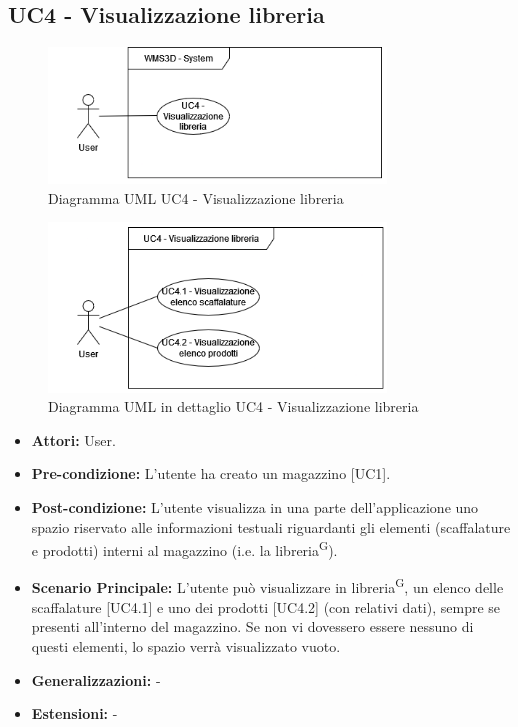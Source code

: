 \subsection{UC4 - Visualizzazione libreria}
\begin{figure}[H]
  \centering
  \includegraphics[width=0.8\textwidth]{UC_diagrams_1-10/UC4_sys.drawio.png}
   \caption{Diagramma UML UC4 - Visualizzazione libreria}
\end{figure}
\begin{figure}[H]
  \centering
  \includegraphics[width=0.8\textwidth]{UC_diagrams_1-10/UC4.drawio.png}
   \caption{Diagramma UML in dettaglio UC4 - Visualizzazione libreria}
\end{figure}
\begin{itemize}
    \item \textbf{Attori:} User.
    \item \textbf{Pre-condizione:}  L'utente ha creato un magazzino [UC1].
    \item \textbf{Post-condizione:} L'utente visualizza in una parte dell'applicazione uno spazio riservato alle informazioni testuali riguardanti gli elementi (scaffalature e prodotti) interni al magazzino (i.e. la libreria\textsuperscript{G}).
    \item \textbf{Scenario Principale:}  L'utente può visualizzare in libreria\textsuperscript{G}, un elenco delle scaffalature [UC4.1] e uno dei prodotti [UC4.2] (con relativi dati), sempre se presenti all'interno del magazzino. Se non vi dovessero essere nessuno di questi elementi, lo spazio verrà visualizzato vuoto.
    \item \textbf{Generalizzazioni:} -
    \item \textbf{Estensioni:} -
\end{itemize}


